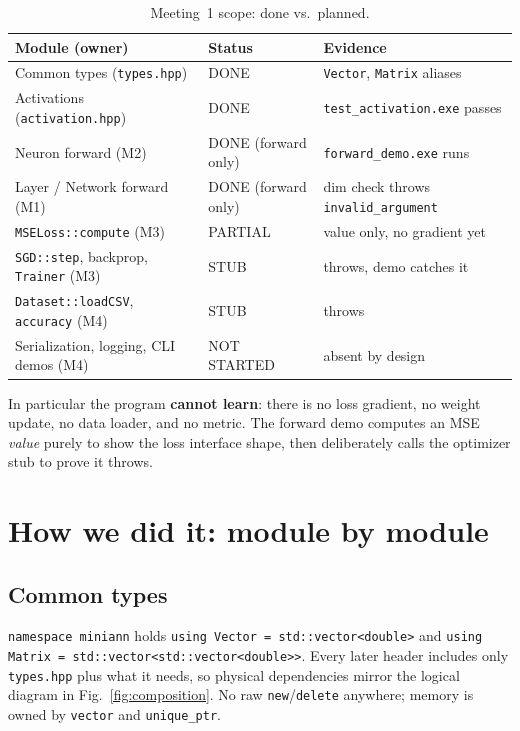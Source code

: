 \documentclass[11pt,a4paper]{article}
\begin{document}
\begin{table}[h]
\centering
\caption{Meeting~1 scope: done vs.\ planned.}\label{tab:scope}
\begin{tabular}{@{}lll@{}}
\toprule
Module (owner) & Status & Evidence \\
\midrule
Common types (\texttt{types.hpp}) & DONE & \texttt{Vector}, \texttt{Matrix} aliases \\
Activations (\texttt{activation.hpp}) & DONE & \texttt{test\_activation.exe} passes \\
Neuron forward (M2) & DONE (forward only) & \texttt{forward\_demo.exe} runs \\
Layer / Network forward (M1) & DONE (forward only) & dim check throws \texttt{invalid\_argument} \\
\texttt{MSELoss::compute} (M3) & PARTIAL & value only, no gradient yet \\
\texttt{SGD::step}, backprop, \texttt{Trainer} (M3) & STUB & throws, demo catches it \\
\texttt{Dataset::loadCSV}, \texttt{accuracy} (M4) & STUB & throws \\
Serialization, logging, CLI demos (M4) & NOT STARTED & absent by design \\
\bottomrule
\end{tabular}
\end{table}

In particular the program \textbf{cannot learn}: there is no loss gradient, no weight update, no
data loader, and no metric. The forward demo computes an MSE \emph{value} purely to show the loss
interface shape, then deliberately calls the optimizer stub to prove it throws.

\section{How we did it: module by module}

\subsection{Common types}
\texttt{namespace miniann} holds \texttt{using Vector = std::vector<double>} and
\texttt{using Matrix = std::vector<std::vector<double>>}. Every later header includes only
\texttt{types.hpp} plus what it needs, so physical dependencies mirror the logical diagram in
Fig.~\ref{fig:composition}. No raw \texttt{new}/\texttt{delete} anywhere; memory is owned by
\texttt{vector} and \texttt{unique\_ptr}.
\end{document}
